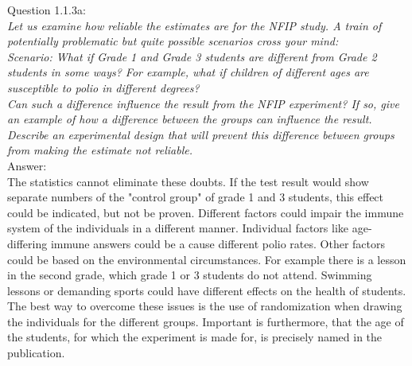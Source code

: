 
Question 1.1.3a:\\	
\textsl{Let us examine how reliable the estimates are for the NFIP study. A train of potentially problematic but quite possible scenarios cross your mind:\\Scenario: What if Grade 1 and Grade 3 students are different from Grade 2 students in some ways? For example, what if children of different ages are susceptible to polio in different degrees?\\Can such a difference influence the result from the NFIP experiment? If so, give an example of how a difference between the groups can influence the result. Describe an experimental design that will prevent this difference between groups from making the estimate not reliable.}\\

Answer:\\
The statistics cannot eliminate these doubts. If the test result would show separate numbers of the "control group" of grade 1 and 3 students, this effect could be indicated, but not be proven. Different factors could impair the immune system of the individuals in a different manner. Individual factors like age-differing immune answers could be a cause different polio rates. Other factors could be based on the environmental circumstances. For example there is a lesson in the second grade, which grade 1 or 3 students do not attend. Swimming lessons or demanding sports could have different effects on the health of students.\\

The best way to overcome these issues is the use of randomization when drawing the individuals for the different groups. Important is furthermore, that the age of the students, for which the experiment is made for, is precisely named in the publication.\\